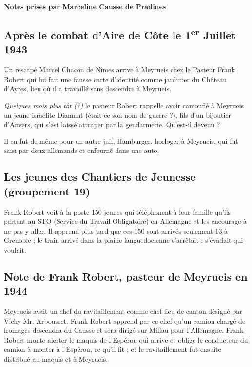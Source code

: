 

\begin{center}
\vspace{0.5em}
{\bfseries Notes prises par Marceline Causse de Pradines}
\end{center}


\subsection{Après le combat d’Aire de Côte le 1\textsuperscript{er} Juillet 1943}

Un rescapé Marcel Chacon de Nîmes arrive à Meyrueis chez le Pasteur Frank Robert qui lui
fait une fausse carte d’identité comme jardinier du Château d’Ayres, lieu où il a travaillé sans
descendre à Meyrueis.

\noindent\textit{Quelques mois plus tôt (?)} le pasteur Robert rappelle avoir camouflé à Meyrueis un jeune
israélite Diamant (était-ce son nom de guerre ?), fils d’un bijoutier d’Anvers, qui s’est laissé
attraper par la gendarmerie. Qu’est-il devenu ?

Il en fut de même pour un autre juif, Hamburger, horloger à Meyrueis, qui fut saisi par deux
allemands et enfourné dans une auto.

\subsection{Les jeunes des Chantiers de Jeunesse (groupement 19)}

Frank Robert voit à la poste 150 jeunes qui téléphonent à leur famille qu’ils partent au STO
(Service du Travail Obligatoire) en Allemagne et les encourage à ne pas y aller. Il apprend
plus tard que ces 150 sont arrivés seulement 13 à Grenoble ; le train arrivé dans la plaine
languedocienne s’arrêtait : s’évadait qui voulait.

\subsection{Note de Frank Robert, pasteur de Meyrueis en 1944}

Meyrueis avait un chef du ravitaillement comme chef lieu de canton désigné par Vichy
Mr. Arbousset. Frank Robert apprend par ce chef qu’un camion chargé de fromages
descendra du Causse et sera dirigé sur Millau pour l’Allemagne. Frank Robert monte alerter le
maquis de l’Espérou qui arrive et oblige le conducteur du camion à monter à l’Espérou, ce
qu’il fit ; et le ravitaillement fut ensuite distribué au maquis et à Meyrueis.

